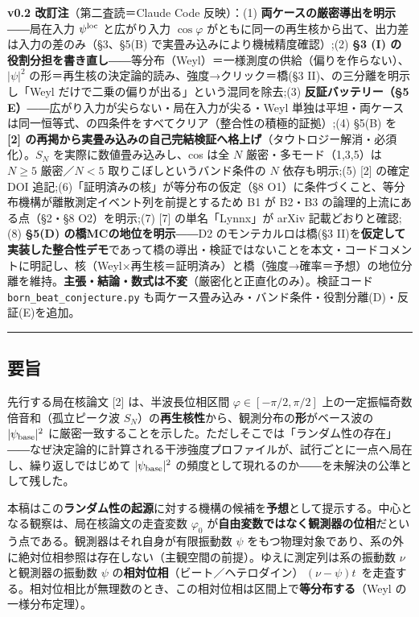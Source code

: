 \documentclass[
]{ltjsarticle}
\begin{document}
\textbf{v0.2 改訂注}（第二査読＝Claude Code 反映）：(1)
\textbf{両ケースの厳密導出を明示}――局在入力 \(\psi^{\rm loc}\)
と広がり入力 \(\cos\varphi\)
がともに同一の再生核から出て、出力差は入力の差のみ（§3、§5(B)
で実畳み込みにより機械精度確認）;(2) \textbf{§3 (I)
の役割分担を書き直し}――等分布（Weyl）＝一様測度の供給（偏りを作らない）、\(|\psi|^2\)
の形＝再生核の決定論的読み、強度→クリック＝橋(§3
II)、の三分離を明示し「Weyl だけで二乗の偏りが出る」という混同を除去;(3)
\textbf{反証バッテリー（§5
E）}――広がり入力が尖らない・局在入力が尖る・Weyl
単独は平坦・両ケースは同一恒等式、の四条件をすべてクリア（整合性の積極的証拠）;(4)
§5(B) を \textbf{{[}2{]}
の再掲から実畳み込みの自己完結検証へ格上げ}（タウトロジー解消・必須化）。\(S_N\)
を実際に数値畳み込みし、cos は全 \(N\) 厳密・多モード（1,3,5）は
\(N\ge5\) 厳密／\(N<5\) 取りこぼしというバンド条件の \(N\)
依存も明示;(5) {[}2{]} の確定 DOI
追記;(6)「証明済みの核」が等分布の仮定（§8
O1）に条件づくこと、等分布機構が離散測定イベント列を前提とするため B1 が
B2・B3 の論理的上流にある点（§2・§8 O2）を明示;(7) {[}7{]}
の単名「Lynnx」が arXiv 記載どおりと確認;(8) \textbf{§5(D)
の橋MCの地位を明示}――D2 のモンテカルロは橋(§3
II)を\textbf{仮定して実装した整合性デモ}であって橋の導出・検証ではないことを本文・コードコメントに明記し、核（Weyl×再生核＝証明済み）と橋（強度→確率＝予想）の地位分離を維持。\textbf{主張・結論・数式は不変}（厳密化と正直化のみ）。検証コード
\texttt{born\_beat\_conjecture.py}
も両ケース畳み込み・バンド条件・役割分離(D)・反証(E)を追加。

\begin{center}\rule{0.5\linewidth}{0.5pt}\end{center}

\subsection{要旨}\label{ux8981ux65e8}

先行する局在核論文 {[}2{]} は、半波長位相区間
\(\varphi\in[-\pi/2,\pi/2]\) 上の一定振幅奇数倍音和（孤立ピーク波
\(S_N\)）の\textbf{再生核性}から、観測分布の\textbf{形}がベース波の
\(|\psi_{\rm base}|^2\)
に厳密一致することを示した。ただしそこでは「ランダム性の存在」――なぜ決定論的に計算される干渉強度プロファイルが、試行ごとに一点へ局在し、繰り返しではじめて
\(|\psi_{\rm base}|^2\)
の頻度として現れるのか――を未解決の公準として残した。

本稿はこの\textbf{ランダム性の起源}に対する機構の候補を\textbf{予想}として提示する。中心となる観察は、局在核論文の走査変数
\(\varphi_0\)
が\textbf{自由変数ではなく観測器の位相}だという点である。観測器はそれ自身が有限振動数
\(\psi\)
をもつ物理対象であり、系の外に絶対位相参照は存在しない（主観空間の前提）。ゆえに測定列は系の振動数
\(\nu\) と観測器の振動数 \(\psi\)
の\textbf{相対位相}（ビート／ヘテロダイン）\(\,(\nu-\psi)t\,\)
を走査する。相対位相比が無理数のとき、この相対位相は区間上で\textbf{等分布する}（Weyl
の一様分布定理）。
\end{document}
